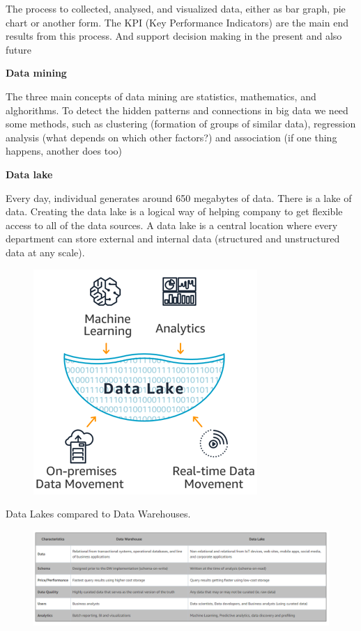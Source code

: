 \documentclass[]{book}
\begin{document}
The process to collected, analysed, and visualized data, either as bar
graph, pie chart or another form. The KPI (Key Performance Indicators)
are the main end results from this process. And support decision making
in the present and also future

\textbf{Data mining}

The three main concepts of data mining are statistics, mathematics, and
alghorithms. To detect the hidden patterns and connections in big data
we need some methods, such as clustering (formation of groups of similar
data), regression analysis (what depends on which other factors?) and
association (if one thing happens, another does too)

\textbf{Data lake}

Every day, individual generates around 650 megabytes of data. There is a
lake of data. Creating the data lake is a logical way of helping company
to get flexible access to all of the data sources. A data lake is a
central location where every department can store external and internal
data (structured and unstructured data at any scale).

\begin{figure}
\centering
\includegraphics{datalake1.png}
\caption{}
\end{figure}

Data Lakes compared to Data Warehouses.

\begin{figure}
\centering
\includegraphics{datalake.PNG}
\caption{}
\end{figure}
\end{document}
